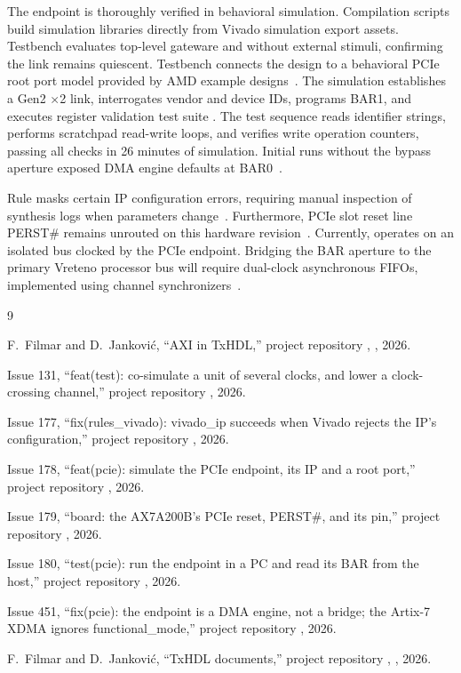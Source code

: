 \documentclass[journal,9pt]{IEEEtran}
\begin{document}
The endpoint is thoroughly verified in behavioral simulation. Compilation
scripts build simulation libraries directly from Vivado simulation export assets.
Testbench  evaluates top-level gateware and
 without external stimuli, confirming the link remains quiescent.
Testbench  connects the design to a behavioral PCIe
root port model provided by AMD example designs~\cite{i178}. The simulation
establishes a Gen2 $\times$2 link, interrogates vendor and device IDs, programs
BAR1, and executes register validation test suite .
The test sequence reads identifier strings, performs scratchpad read-write
loops, and verifies write operation counters, passing all checks in 26 minutes
of simulation. Initial runs without the bypass aperture exposed DMA engine
defaults at BAR0~\cite{i451}.

Rule  masks certain IP configuration errors, requiring manual
inspection of synthesis logs when parameters change~\cite{i177}. Furthermore,
PCIe slot reset line PERST\# remains unrouted on this hardware
revision~\cite{i179}. Currently,  operates on an isolated bus
clocked by the PCIe endpoint. Bridging the BAR aperture to the primary Vreteno
processor bus will require dual-clock asynchronous FIFOs, implemented using
 channel synchronizers~\cite{i131}.

\begin{thebibliography}{9}

F.~Filmar and D.~Janković, ``AXI in TxHDL,'' project repository
, , 2026.

Issue 131, ``feat(test): co-simulate a unit of several clocks, and
lower a clock-crossing channel,'' project repository ,
2026.

Issue 177, ``fix(rules\_vivado): vivado\_ip succeeds when Vivado
rejects the IP's configuration,'' project repository
, 2026.

Issue 178, ``feat(pcie): simulate the PCIe endpoint, its IP and a root
port,'' project repository , 2026.

Issue 179, ``board: the AX7A200B's PCIe reset, PERST\#, and its pin,''
project repository , 2026.

Issue 180, ``test(pcie): run the endpoint in a PC and read its BAR from
the host,'' project repository , 2026.

Issue 451, ``fix(pcie): the endpoint is a DMA engine, not a bridge;
the Artix-7 XDMA ignores functional\_mode,'' project repository
, 2026.

F.~Filmar and D.~Janković, ``TxHDL documents,'' project repository
, , 2026.

\end{thebibliography}
\end{document}
